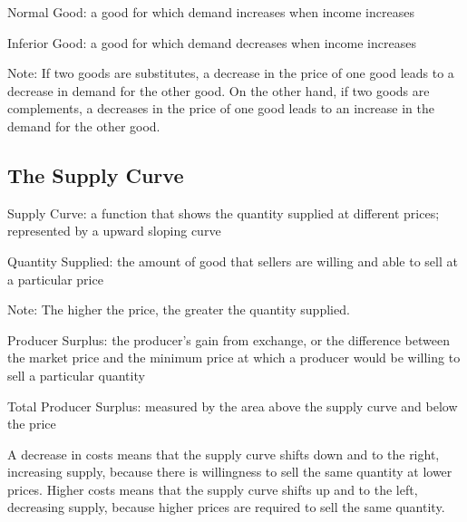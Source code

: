 \documentclass[12pt]{article}
\begin{document}
\begin{definition} Normal Good: a good for which demand increases when income increases \end{definition}
\begin{definition} Inferior Good: a good for which demand decreases when income increases \end{definition}
Note: If two goods are substitutes, a decrease in the price of one good leads to a decrease in demand for the other good. On the other hand, if two goods are complements, a decreases in the price of one good leads to an increase in the demand for the other good. 

\subsection{The Supply Curve} 
\begin{definition} Supply Curve: a function that shows the quantity supplied at different prices; represented by a upward sloping curve  \end{definition}
\begin{definition} Quantity Supplied: the amount of good that sellers are willing and able to sell at a particular price\end{definition}
Note: The higher the price, the greater the quantity supplied. 
\begin{definition} Producer Surplus: the producer's gain from exchange, or the difference between the market price and the minimum price at which a producer would be willing to sell a particular quantity \end{definition}
\begin{definition} Total Producer Surplus: measured by the area above the supply curve and below the price \end{definition}
A decrease in costs means that the supply curve shifts down and to the right, increasing supply, because there is willingness to sell the same quantity at lower prices. Higher costs means that the supply curve shifts up and to the left, decreasing supply, because higher prices are required to sell the same quantity. \\~\\
\end{document}
